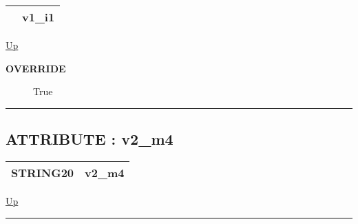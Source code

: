 {\renewcommand{\arraystretch}{1.5}
\begin{tabularx}{\textwidth}{|>{\raggedright\arraybackslash}l|X|}
\hline
\hspace{0pt} & v1\_i1 \\
\hline
\end{tabularx}
}

\hyperlink{ecldoc:intest.in1intest.example_2.mod_4}{Up}

\par

\par
\begin{description}
\item [\textbf{OVERRIDE}] True
\end{description}

\rule{\textwidth}{0.4pt}
\subsection*{ATTRIBUTE : v2\_m4}
\hypertarget{ecldoc:intest.in1intest.example_2.mod_4.v2_m4}{}

{\renewcommand{\arraystretch}{1.5}
\begin{tabularx}{\textwidth}{|>{\raggedright\arraybackslash}l|X|}
\hline
\hspace{0pt}STRING20 & v2\_m4 \\
\hline
\end{tabularx}
}

\hyperlink{ecldoc:intest.in1intest.example_2.mod_4}{Up}

\par


\rule{\textwidth}{0.4pt}




